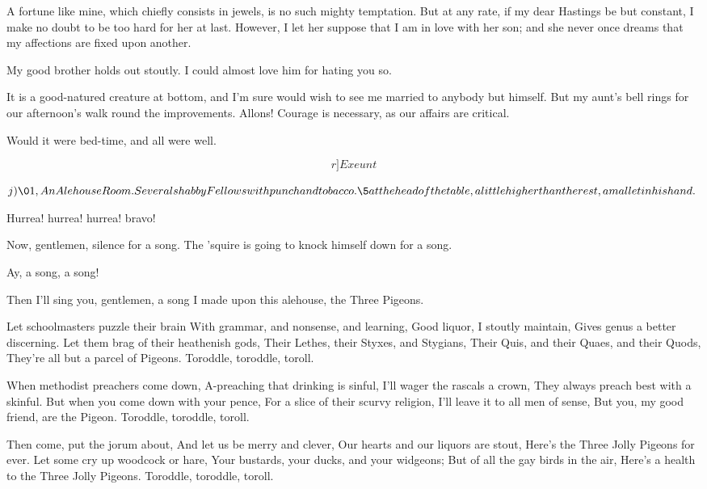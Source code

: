 \documentclass{book}
\begin{document}
\9  A fortune like mine, which chiefly consists in jewels,
is no such mighty temptation.  But at any rate, if my dear Hastings be
but constant, I make no doubt to be too hard for her at last.  However,
I let her suppose that I am in love with her son; and she never once
dreams that my affections are fixed upon another.

\8  My good brother holds out stoutly.  I could almost
love him for hating you so.

\9  It is a good-natured creature at bottom, and I'm sure
would wish to see me married to anybody but himself.  But my aunt's
bell rings for our afternoon's walk round the improvements.  Allons! 
Courage is necessary, as our affairs are critical.

\8 Would it were bed-time, and all were well. 

\[r]Exeunt\]

\(j)\01, An Alehouse Room.  Several shabby Fellows with punch and
tobacco.  \5 at the head of the table, a little higher than the
rest, a mallet in his hand.\)


  Hurrea! hurrea! hurrea! bravo!

  Now, gentlemen, silence for a song.  The 'squire is
going to knock himself down for a song.

  Ay, a song, a song!

\5  Then I'll sing you, gentlemen, a song I made upon this
alehouse, the Three Pigeons.

\SpatiumSupra {}

\begin{versus}
\Forma {}
\Locus \textus {+4em}
\itshape

Let schoolmasters puzzle their brain
     With grammar, and nonsense, and learning,
Good liquor, I stoutly maintain,
     Gives \textup{genus} a better discerning.
Let them brag of their heathenish gods,
     Their Lethes, their Styxes, and Stygians,
Their Quis, and their Quaes, and their Quods,
     They're all but a parcel of Pigeons.
          \textup{Toroddle, toroddle, toroll.}

When methodist preachers come down,
     A-preaching that drinking is sinful,
I'll wager the rascals a crown,
     They always preach best with a skinful.
But when you come down with your pence,
     For a slice of their scurvy religion,
I'll leave it to all men of sense,
     But you, my good friend, are the Pigeon.
          \textup{Toroddle, toroddle, toroll.}

Then come, put the jorum about,
     And let us be merry and clever,
Our hearts and our liquors are stout,
     Here's the Three Jolly Pigeons for ever.
Let some cry up woodcock or hare,
     Your bustards, your ducks, and your widgeons;
But of all the \textup{gay} birds in the air,
     Here's a health to the Three Jolly Pigeons.
          \textup{Toroddle, toroddle, toroll.}

\end{versus}
\end{document}

